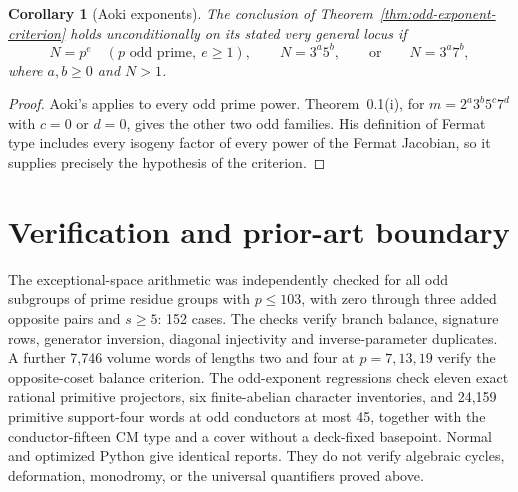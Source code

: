 \documentclass[11pt]{article}
\newtheorem{corollary}[theorem]{Corollary}
\theoremstyle{definition}
\begin{document}
\begin{corollary}[Aoki exponents]
\label{cor:aoki-odd-exponents}
The conclusion of Theorem~\ref{thm:odd-exponent-criterion} holds
unconditionally on its stated very general locus if
\[
 N=p^e\quad(p\text{ odd prime},\ e\ge1),\qquad
 N=3^a5^b,\qquad\text{or}\qquad N=3^a7^b,
\]
where $a,b\ge0$ and $N>1$.
\end{corollary}
\begin{proof}
Aoki's \cite[Theorem~0.1(ii)]{Aoki2000} applies to every odd prime power.
Theorem~0.1(i), for
$m=2^a3^b5^c7^d$ with $c=0$ or $d=0$, gives the other two odd
families. His definition of Fermat type includes every isogeny
factor of every power of the Fermat Jacobian, so it supplies
precisely the hypothesis of the criterion.
\end{proof}


\section{Verification and prior-art boundary}
The exceptional-space arithmetic was independently checked for all odd
subgroups of prime residue groups with $p\le103$, with zero through three
added opposite pairs and $s\ge5$: 152 cases. The checks verify branch
balance, signature rows, generator inversion, diagonal injectivity and
inverse-parameter duplicates. A further 7,746 volume words of lengths two
and four at $p=7,13,19$ verify the opposite-coset balance criterion.
The odd-exponent regressions check eleven exact rational primitive
projectors, six finite-abelian character inventories, and 24,159
primitive support-four words at odd conductors at most 45, together
with the conductor-fifteen CM type and a cover without a deck-fixed
basepoint. Normal and optimized Python give identical reports.
They do not verify algebraic cycles,
deformation, monodromy, or the universal quantifiers proved above.
\end{document}

